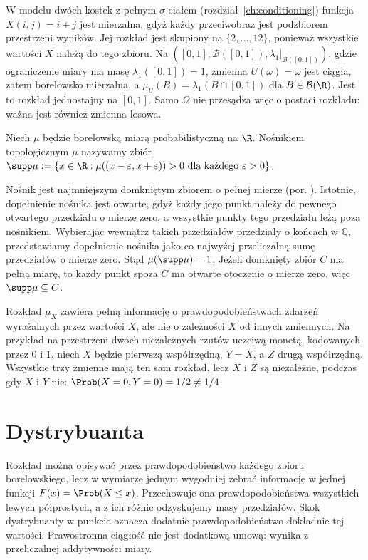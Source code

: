 \begin{przyklad}
W modelu dwóch kostek z pełnym $\sigma$-ciałem
(rozdział~\ref{ch:conditioning}) funkcja $X(i,j)=i+j$ jest
mierzalna, gdyż każdy przeciwobraz jest podzbiorem przestrzeni
wyników. Jej rozkład jest skupiony na $\{2,\ldots,12\}$,
ponieważ wszystkie wartości $X$ należą do tego zbioru.
Na $([0,1],\mathcal B([0,1]),\lambda_1|_{\mathcal B([0,1])})$,
gdzie ograniczenie miary ma masę $\lambda_1([0,1])=1$,
zmienna $U(\omega)=\omega$ jest ciągła, zatem borelowsko mierzalna,
a $\mu_U(B)=\lambda_1(B\cap[0,1])$ dla $B\in\mathcal B(\R)$.
Jest to rozkład jednostajny na $[0,1]$. Samo $\Omega$ nie przesądza więc
o postaci rozkładu: ważna jest również zmienna losowa.
\end{przyklad}

\begin{definicja}
Niech $\mu$ będzie borelowską miarą probabilistyczną na $\R$.
Nośnikiem topologicznym $\mu$ nazywamy zbiór
$\supp\mu:=\{x\in\R:\mu((x-\varepsilon,x+\varepsilon))>0
\text{ dla każdego }\varepsilon>0\}$.
\end{definicja}

Nośnik jest najmniejszym domkniętym zbiorem o pełnej mierze
(por. ).
Istotnie, dopełnienie nośnika jest otwarte, gdyż każdy jego
punkt należy do pewnego otwartego przedziału o mierze zero,
a wszystkie punkty tego przedziału leżą poza nośnikiem.
Wybierając wewnątrz takich przedziałów przedziały o końcach
w $\mathbb Q$, przedstawiamy dopełnienie nośnika jako
co najwyżej przeliczalną sumę przedziałów o mierze zero.
Stąd $\mu(\supp\mu)=1$. Jeżeli domknięty zbiór $C$ ma
pełną miarę, to każdy punkt spoza $C$ ma otwarte otoczenie
o mierze zero, więc $\supp\mu\subseteq C$.

\begin{uwaga}
Rozkład $\mu_X$ zawiera pełną informację o prawdopodobieństwach
zdarzeń wyrażalnych przez wartości $X$, ale nie o zależności $X$
od innych zmiennych. Na przykład na przestrzeni dwóch niezależnych rzutów uczciwą
monetą, kodowanych przez $0$ i $1$, niech $X$ będzie pierwszą
współrzędną, $Y=X$, a $Z$ drugą współrzędną. Wszystkie trzy
zmienne mają ten sam rozkład, lecz $X$ i $Z$ są niezależne,
podczas gdy $X$ i $Y$ nie: $\Prob(X=0,Y=0)=1/2\neq1/4$.
\end{uwaga}

\section{Dystrybuanta}
Rozkład można opisywać przez prawdopodobieństwo każdego zbioru
borelowskiego, lecz w wymiarze jednym wygodniej zebrać
informację w jednej funkcji $F(x)=\Prob(X\leq x)$.
Przechowuje ona prawdopodobieństwa wszystkich lewych półprostych,
a z ich różnic odzyskujemy masy przedziałów. Skok dystrybuanty
w punkcie oznacza dodatnie prawdopodobieństwo dokładnie tej wartości.
Prawostronna ciągłość nie jest dodatkową umową: wynika z
przeliczalnej addytywności miary.

